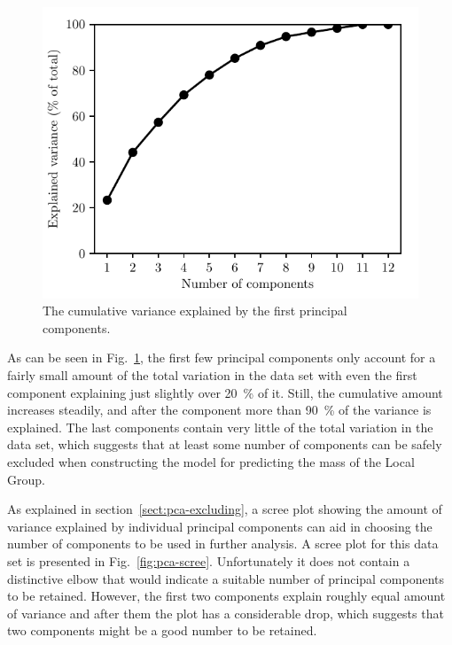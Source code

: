 \documentclass[english, oneside]{HYgradu}
\begin{document}
\begin{figure}
    \centering
    \includegraphics{kuvat/PCA/cumulative_variances.pdf}
    \caption{The cumulative variance explained by the first principal components.}\label{fig:pca-cumulative-variance}
\end{figure}

As can be seen in Fig.~\ref{fig:pca-cumulative-variance}, the first few principal components only account for a fairly small amount of the total variation in the data set with even the first component explaining just slightly over 20~\% of it. Still, the cumulative amount increases steadily, and after the  component more than 90~\% of the variance is explained. The last components contain very little of the total variation in the data set, which suggests that at least some number of components can be safely excluded when constructing the model for predicting the mass of the Local Group.

As explained in section~\ref{sect:pca-excluding}, a scree plot showing the amount of variance explained by individual principal components can aid in choosing the number of components to be used in further analysis. A scree plot for this data set is presented in Fig.~\ref{fig:pca-scree}. Unfortunately it does not contain a distinctive elbow that would indicate a suitable number of principal components to be retained. However, the first two components explain roughly equal amount of variance and after them the plot has a considerable drop, which suggests that two components might be a good number to be retained.  
\end{document}

